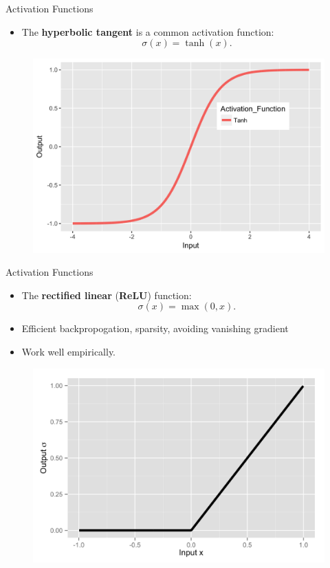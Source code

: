 \documentclass[usenames,dvipsnames,notes,11pt,aspectratio=169]{beamer}
\begin{document}
\begin{frame}{Activation Functions}

\begin{itemize}
\item The \textbf{hyperbolic tangent} is a common activation function:
\[
\sigma(x)=\tanh\left(x\right).
\]
\end{itemize}
\begin{figure}
\includegraphics[height=0.55\textheight]{figures/activationFn-Tanh}
\end{figure}
\end{frame}
%
\begin{frame}{Activation Functions}
\begin{itemize}
\item The \textbf{rectified linear} (\textbf{ReLU}) function:
\[
\sigma(x)=\max(0,x).
\]
\item Efficient backpropogation, sparsity, avoiding vanishing gradient
\item Work well empirically.
\end{itemize}
\begin{figure}
\includegraphics[height=0.55\textheight]{figures/activationFn-Rectified_Linear} 
\end{figure}
\end{frame}
\end{document}
